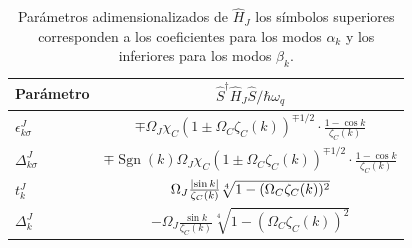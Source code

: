 \begin{table}[h]
\centering
\caption{Parámetros adimensionalizados de $\hat H_J$ los símbolos superiores corresponden a los coeficientes para los modos $\alpha_k$ y los inferiores para los modos $\beta_k$.}
\label{tab:parametros_especializados}
\begin{ruledtabular}
\begin{tabular}{l|c}
Parámetro & $\hat S^\dag\hat H_J \hat S / \hbar \omega_q$ \\
\hline
$\epsilon^J_{k\sigma}$ &  $\mp \Omega_J \chi_C(1\pm \Omega_C \zeta_C(k))^{\mp1/2} \cdot \frac{1-\cos k}{\zeta_C(k)}$ \\
$\Delta^J_{k\sigma}$ &  $\mp \operatorname{Sgn}(k)\Omega_J \chi_C (1\pm \Omega_C\zeta_C(k))^{\mp 1/2}\cdot \frac{1-\cos k}{\zeta_C(k)}$ \\
$t^J_k$ & $\Omega_J \frac{\abs{\sin k}}{\zeta_C(k)}\sqrt[4]{1-(\Omega_C \zeta_C(k))^2}$ \\
$\Delta^J_k$ & $-\Omega_J \frac{\sin k}{\zeta_C(k)}\sqrt[4]{1-(\Omega_C \zeta_C(k))^2}$ 
\end{tabular}
\end{ruledtabular}
\end{table}